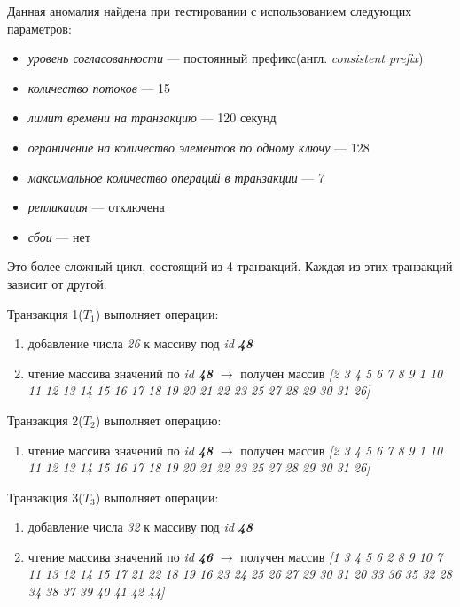 \documentclass[14pt,  openany]{book}
\begin{document}
\par Данная аномалия найдена при тестировании с использованием следующих параметров: 
\begin{itemize}
\item[] \textit{уровень согласованности} --- постоянный префикс(англ.  \textit{consistent prefix})
\item[] \textit{количество потоков} --- 15
\item[] \textit{лимит времени на транзакцию} --- 120 секунд
\item[] \textit{ограничение на количество элементов по одному ключу} --- 128
\item[] \textit{максимальное количество операций в транзакции} --- 7
\item[] \textit{репликация} --- отключена
\item[] \textit{сбои} --- нет
\end{itemize}

Это более сложный цикл, состоящий из 4 транзакций.  Каждая из этих транзакций зависит от другой.  \par

Транзакция 1(\textbf{$T_1$}) выполняет операции:
\begin{enumerate}
\item добавление числа \textit{26} к массиву под \textit{id} \textit{\textbf{48}}
\item чтение массива значений по \textit{id} \textit{\textbf{48}} $\rightarrow$ получен массив \textit{[2 3 4 5 6 7 8 9 1 10 11 12 13 14 15 16 17 18 19 20 21 22 23 25 27 28 29 30 31 26]}
\end{enumerate}

\par Транзакция 2(\textbf{$T_2$}) выполняет операцию:
\begin{enumerate}
\item чтение массива значений по \textit{id} \textit{\textbf{48}} $\rightarrow$ получен массив \textit{[2 3 4 5 6 7 8 9 1 10 11 12 13 14 15 16 17 18 19 20 21 22 23 25 27 28 29 30 31 26]}
\end{enumerate}

\par Транзакция 3(\textbf{$T_3$}) выполняет операции:
\begin{enumerate}
\item добавление числа \textit{32} к массиву под \textit{id} \textit{\textbf{48}}
\item чтение массива значений по \textit{id} \textit{\textbf{46}} $\rightarrow$ получен массив \textit{[1 3 4 5 6 2 8 9 10 7 11 13 12 14 15 17 21 22 18 19 16 23 24 25 26 27 29 30 31 20 33 36 35 32 28 34 38 37 39 40 41 42 44]}
\end{enumerate}
\end{document}

